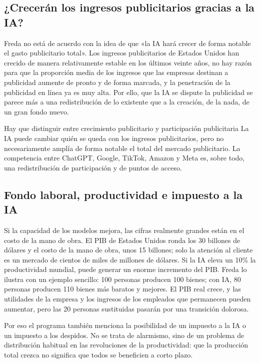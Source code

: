 \documentclass[a4paper]{article}
\begin{document}
\subsection{¿Crecerán los ingresos publicitarios gracias a la IA?}

Freda no está de acuerdo con la idea de que «la IA hará crecer de forma notable el gasto publicitario total». Los ingresos publicitarios de Estados Unidos han crecido de manera relativamente estable en los últimos veinte años, no hay razón para que la proporción media de los ingresos que las empresas destinan a publicidad aumente de pronto y de forma marcada, y la penetración de la publicidad en línea ya es muy alta. Por ello, que la IA se dispute la publicidad se parece más a una redistribución de lo existente que a la creación, de la nada, de un gran fondo nuevo.

\begin{warningbox}{Hay que distinguir entre crecimiento publicitario y participación publicitaria}
La IA puede cambiar quién se queda con los ingresos publicitarios, pero no necesariamente amplía de forma notable el total del mercado publicitario. La competencia entre ChatGPT, Google, TikTok, Amazon y Meta es, sobre todo, una redistribución de participación y de puntos de acceso.
\end{warningbox}

\subsection{Fondo laboral, productividad e impuesto a la IA}

Si la capacidad de los modelos mejora, las cifras realmente grandes están en el costo de la mano de obra. El PIB de Estados Unidos ronda los 30 billones de dólares y el costo de la mano de obra, unos 15 billones; solo la atención al cliente es un mercado de cientos de miles de millones de dólares. Si la IA eleva un 10\% la productividad mundial, puede generar un enorme incremento del PIB. Freda lo ilustra con un ejemplo sencillo: 100 personas producen 100 bienes; con IA, 80 personas producen 110 bienes más baratos y mejores. El PIB real crece, y las utilidades de la empresa y los ingresos de los empleados que permanecen pueden aumentar, pero las 20 personas sustituidas pasarán por una transición dolorosa.

Por eso el programa también menciona la posibilidad de un impuesto a la IA o un impuesto a los despidos. No se trata de alarmismo, sino de un problema de distribución habitual en las revoluciones de la productividad: que la producción total crezca no significa que todos se beneficien a corto plazo.
\end{document}
